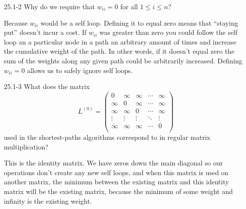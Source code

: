 




\homeworkheader{\classnameandsection}

\begin{problem}{25.1-2}
  Why do we require that $w_{ii} = 0$ for all $1 \le i \le n$?
  \begin{solution}
    Because $w_{ii}$ would be a self loop. Defining it to equal zero means that ``staying put'' doesn't incur a cost. If
    $w_{ii}$ was greater than zero you could follow the self loop an a particular node in a path an arbitrary amount of
    times and increase the cumulative weight of the path.  In other words, if it doesn't equal zero the sum of the
    weights along any given path could be arbitrarily increased. Defining $w_{ii} = 0$ allows us to safely ignore self
    loops.
  \end{solution}
\end{problem}

\begin{problem}{25.1-3}
  What does the matrix
  \[
   L^{(0)} =
   \begin{pmatrix}
    0 & \infty & \infty & \cdots & \infty\\
    \infty & 0 & \infty & \cdots & \infty\\
    \infty & \infty & 0 & \cdots & \infty\\
    \vdots & \vdots & \vdots & \ddots & \vdots \\
    \infty & \infty & \infty & \cdots & 0 \\
   \end{pmatrix}
  \]
  used in the shortest-paths algorithms correspond to in regular matrix multiplication?
  \begin{solution}
    This is the identity matrix. We have zeros down the main diagonal so our operations don't create any new self loops,
    and when this matrix is used on another matrix, the minimum between the existing matrix and this identity matrix
    will be the existing matrix, because the minimum of some weight and infinity is the existing weight.
  \end{solution}
\end{problem}

